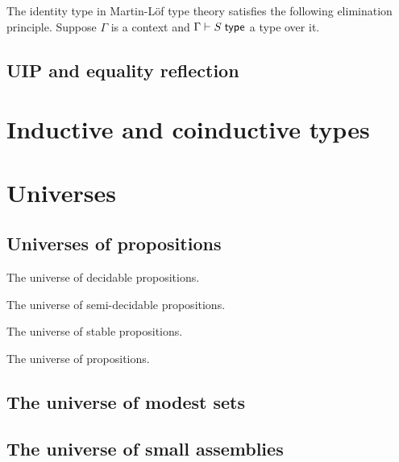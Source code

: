 The identity type in Martin-Löf type theory satisfies the following elimination principle. Suppose $\Gamma$ is a context and $\Gamma \vdash S \;\mathsf{type}$ a type over it.




\subsection{UIP and equality reflection}
\label{sec:uip-equal-refl}

\section{Inductive and coinductive types}
\label{sec:inductive-counductive-types}

\section{Universes}
\label{sec:universes}

\subsection{Universes of propositions}
\label{sec:universe-propositions}

The universe of decidable propositions.

The universe of semi-decidable propositions.

The universe of stable propositions.

The universe of propositions.

\subsection{The universe of modest sets}
\label{sec:universe-modest-sets}

\subsection{The universe of small assemblies}
\label{sec:univ-small-assembl}



